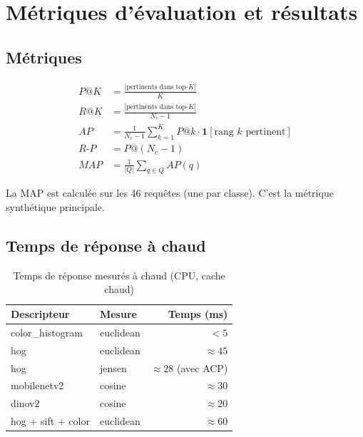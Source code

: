 \documentclass[12pt,a4paper]{report}
\begin{document}
\chapter{Métriques d'évaluation et résultats}

\section{Métriques}

\begin{align*}
  P@K &= \frac{|\text{pertinents dans top-}K|}{K} \\[4pt]
  R@K &= \frac{|\text{pertinents dans top-}K|}{N_c - 1} \\[4pt]
  AP  &= \frac{1}{N_c-1}\sum_{k=1}^{K} P@k \cdot \mathbf{1}[\text{rang }k\text{ pertinent}] \\[4pt]
  R\text{-}P &= P@(N_c-1) \\[4pt]
  MAP &= \frac{1}{|Q|}\sum_{q \in Q} AP(q)
\end{align*}

La MAP est calculée sur les 46 requêtes (une par classe). C'est la métrique synthétique principale.

\section{Temps de réponse à chaud}

\begin{table}[H]
  \centering
  \begin{tabular}{llr}
    \toprule
    Descripteur & Mesure & Temps (ms) \\
    \midrule
    color\_histogram & euclidean & $< 5$ \\
    hog              & euclidean & $\approx 45$ \\
    hog              & jensen    & $\approx 28$ (avec ACP) \\
    mobilenetv2      & cosine    & $\approx 30$ \\
    dinov2           & cosine    & $\approx 20$ \\
    hog + sift + color & euclidean & $\approx 60$ \\
    \bottomrule
  \end{tabular}
  \caption{Temps de réponse mesurés à chaud (CPU, cache chaud)}
\end{table}
\end{document}
